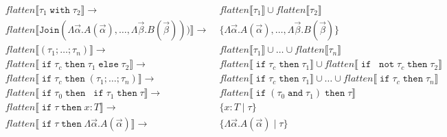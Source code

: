 \documentclass[10pt]{article}
\def\denot#1{{\llbracket #1 \rrbracket}}
\newcommand\SumType{\texttt{Join}}
\newcommand\Tif{\mathrel{\texttt{if}}}
\newcommand\Tnot{\mathrel{\texttt{not}}}
\newcommand\Tand{\mathrel{\texttt{and}}}
\newcommand\Tthen{\mathrel{\texttt{then}}}
\newcommand\Telse{\mathrel{\texttt{else}}}
\newcommand\Twith{\mathrel{\texttt{with}}}
\newcommand\Guard{\;|\;}
\begin{document}
\begin{table}[!h]
  \begin{align*}
    flatten\denot{\tau_1 \Twith \tau_2} \rightarrow &\;
      flatten\denot{\tau_1} \cup flatten\denot{\tau_2}
    \\
    flatten\denot{\SumType(
      \Lambda \vec{\alpha}. A(\vec{\alpha}), \ldots,
      \Lambda \vec{\beta}.  B(\vec{\beta})))}
    \rightarrow &\;
      \{ \Lambda \vec{\alpha}. A(\vec{\alpha}), \ldots,
         \Lambda \vec{\beta}. B(\vec{\beta}) \}
    \\
    flatten\denot{(\tau_1; \ldots; \tau_n)} \rightarrow &\;
      flatten\denot{\tau_1} \cup \ldots \cup flatten\denot{\tau_n}
    \\
    flatten\denot{\Tif \tau_c \Tthen \tau_1 \Telse \tau_2}
    \rightarrow &\;
      flatten\denot{\Tif \tau_c \Tthen \tau_1} \cup
      flatten\denot{\Tif\;\Tnot \tau_c \Tthen \tau_2}
    \\
    flatten\denot{\Tif \tau_c \Tthen (\tau_1; \ldots; \tau_n)}
    \rightarrow &\;
      flatten\denot{\Tif \tau_c \Tthen \tau_1} \cup \ldots \cup
      flatten\denot{\Tif \tau_c \Tthen \tau_n}
    \\
    flatten\denot{\Tif \tau_0 \Tthen\;\Tif \tau_1 \Tthen \tau}
    \rightarrow &\;
      flatten\denot{\Tif (\tau_0 \Tand \tau_1) \Tthen \tau}
    \\
    flatten\denot{\Tif \tau \Tthen x : T}
    \rightarrow &\; \{ x : T \Guard \tau \}
    \\
    flatten\denot{\Tif \tau \Tthen \Lambda \vec{\alpha}. A(\vec{\alpha})}
    \rightarrow &\; \{\Lambda \vec{\alpha}. A(\vec{\alpha}) \Guard \tau \}
    \\
  \end{align*}

  \begin{prooftree}
  \end{prooftree}

  \begin{prooftree}
  \end{prooftree}
\end{table}
\end{document}
